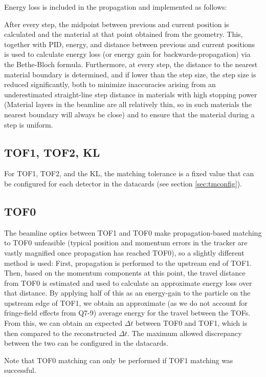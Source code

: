 Energy loss is included in the propagation and implemented as follows:

After every step, the midpoint between previous and current position is calculated and the material at that point
obtained from the geometry. This, together with PID, energy, and distance between previous and current positions
is used to calculate energy loss (or energy gain for backwards-propagation) via the Bethe-Bloch formula. Furthermore,
at every step, the distance to the nearest material boundary is determined, and if lower than the step size, the
step size is reduced significantly, both to minimize inaccuracies arising from an underestimated straight-line step
distance in materials with high stopping power (Material layers in the beamline are all relatively thin, so in such
materials the nearest boundary will always be close) and to ensure that the material during a step is uniform.

\subsection{TOF1, TOF2, KL}\label{subsec:tmtof12kl}

For TOF1, TOF2, and the KL, the matching tolerance is a fixed value that can be configured for each detector in the
datacards (see section \ref{sec:tmconfig}).

\subsection{TOF0}\label{subsec:tmtof0}

The beamline optics between TOF1 and TOF0 make propagation-based matching to TOF0 unfeasible (typical position and
momentum errors in the tracker are vastly magnified once propagation has reached TOF0), so a slightly different method
is used: First, propagation is performed to the upstream end of TOF1. Then, based on the momentum components at this
point, the travel distance from TOF0 is estimated and used to calculate an approximate energy loss over that distance.
By applying half of this as an energy-gain to the particle on the upstream edge of TOF1, we obtain an approximate
(as we do not account for fringe-field effects from Q7-9) average energy for the travel between the TOFs. From this,
we can obtain an expected $\Delta t$ between TOF0 and TOF1, which is then compared to the reconstructed $\Delta t$.
The maximum allowed discrepancy between the two can be configured in the datacards.

Note that TOF0 matching can only be performed if TOF1 matching was successful.

